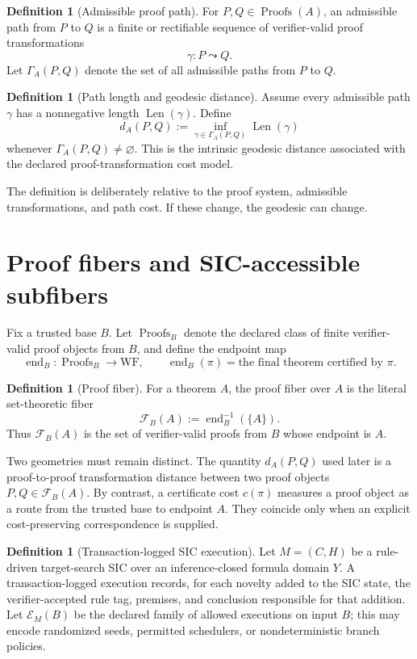 \documentclass[11pt]{article}
\theoremstyle{definition}
\newtheorem{definition}[theorem]{Definition}
\newcommand{\Proofs}{\operatorname{Proofs}}
\newcommand{\len}{\operatorname{Len}}
\newcommand{\distA}{d_A}
\newcommand{\Fib}{\mathcal F}
\newcommand{\Run}{\mathcal E}
\begin{document}
\begin{definition}[Admissible proof path]
For $P,Q\in\Proofs(A)$, an admissible path from $P$ to $Q$ is a finite or rectifiable sequence of verifier-valid proof transformations
\[
\gamma:P\leadsto Q.
\]
Let $\Gamma_A(P,Q)$ denote the set of all admissible paths from $P$ to $Q$.
\end{definition}

\begin{definition}[Path length and geodesic distance]
Assume every admissible path $\gamma$ has a nonnegative length $\len(\gamma)$.  Define
\[
\boxed{
\distA(P,Q)
:=
\inf_{\gamma\in\Gamma_A(P,Q)}\len(\gamma)
}
\]
whenever $\Gamma_A(P,Q)\neq\varnothing$.
This is the intrinsic geodesic distance associated with the declared proof-transformation cost model.
\end{definition}

The definition is deliberately relative to the proof system, admissible transformations, and path cost.  If these change, the geodesic can change.

\section{Proof fibers and SIC-accessible subfibers}

Fix a trusted base $B$.  Let $\Proofs_B$ denote the declared class of finite verifier-valid proof objects from $B$, and define the endpoint map
\[
\operatorname{end}_B:\Proofs_B\longrightarrow \mathrm{WF},
\qquad
\operatorname{end}_B(\pi)=\text{the final theorem certified by }\pi.
\]

\begin{definition}[Proof fiber]
For a theorem $A$, the proof fiber over $A$ is the literal set-theoretic fiber
\[
\boxed{
\Fib_B(A):=\operatorname{end}_B^{-1}(\{A\}).
}
\]
Thus $\Fib_B(A)$ is the set of verifier-valid proofs from $B$ whose endpoint is $A$.
\end{definition}

Two geometries must remain distinct.  The quantity $d_A(P,Q)$ used later is a proof-to-proof transformation distance between two proof objects $P,Q\in\Fib_B(A)$.  By contrast, a certificate cost $c(\pi)$ measures a proof object as a route from the trusted base to endpoint $A$.  They coincide only when an explicit cost-preserving correspondence is supplied.

\begin{definition}[Transaction-logged SIC execution]
Let $M=(C,H)$ be a rule-driven target-search SIC over an inference-closed formula domain $Y$.  A transaction-logged execution records, for each novelty added to the SIC state, the verifier-accepted rule tag, premises, and conclusion responsible for that addition.  Let $\Run_M(B)$ be the declared family of allowed executions on input $B$; this may encode randomized seeds, permitted schedulers, or nondeterministic branch policies.
\end{definition}
\end{document}

